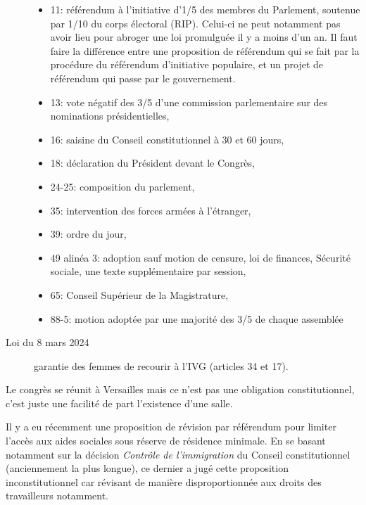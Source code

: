 \documentclass[math]{cours}
\begin{document}
\begin{description}
\begin{itemize}
		      \item 11: référendum à l'initiative d'1/5 des membres du Parlement, soutenue par 1/10 du corps électoral (RIP).
		            Celui-ci ne peut notamment pas avoir lieu pour abroger une loi promulguée il y a moins d'un an.
		            Il faut faire la différence entre une proposition de référendum qui se fait par la procédure du référendum d'initiative populaire, et un projet de référendum qui passe par le gouvernement.
		      \item 13: vote négatif des 3/5 d'une commission parlementaire sur des nominations présidentielles,
		      \item 16: saisine du Conseil constitutionnel à 30 et 60 jours,
		      \item 18: déclaration du Président devant le Congrès,
		      \item 24-25: composition du parlement,
		      \item 35: intervention des forces armées à l'étranger,
		      \item 39: ordre du jour,
		      \item 49 alinéa 3: adoption sauf motion de censure, loi de finances, Sécurité sociale, une texte supplémentaire par session,
		      \item 65: Conseil Supérieur de la Magistrature,
		      \item 88-5: motion adoptée par une majorité des 3/5 de chaque assemblée
	      \end{itemize}
	\item[Loi du 8 mars 2024] garantie des femmes de recourir à l'IVG (articles 34 et 17).
\end{description}
Le congrès se réunit à Versailles mais ce n'est pas une obligation constitutionnel, c'est juste une facilité de part l'existence d'une salle.

Il y a eu récemment une proposition de révision par référendum pour limiter l'accès aux aides sociales sous réserve de résidence minimale.
En se basant notamment sur la décision \emph{Contrôle de l'immigration} du Conseil constitutionnel (anciennement la plus longue), ce dernier a jugé cette proposition inconstitutionnel car révisant de manière disproportionnée aux droits des travailleurs notamment.
\end{document}
